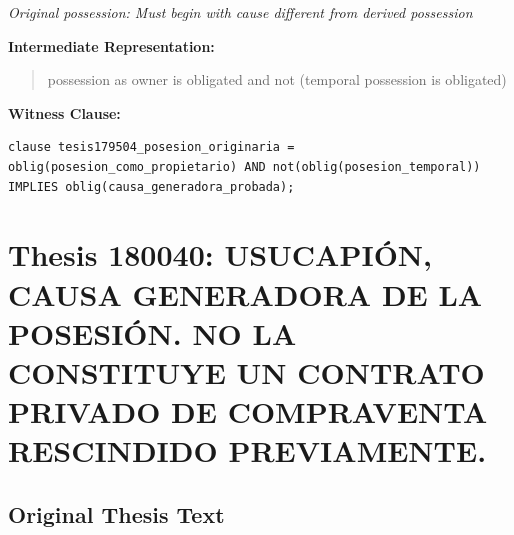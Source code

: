 \documentclass[11pt,a4paper]{article}
\begin{document}
\textit{Original possession: Must begin with cause different from derived possession}

\textbf{Intermediate Representation:}

\begin{quote}
possession as owner is obligated and not (temporal possession is obligated)
\end{quote}

\textbf{Witness Clause:}

\begin{lstlisting}[style=witnessstyle, language=Witness]
clause tesis179504_posesion_originaria = oblig(posesion_como_propietario) AND not(oblig(posesion_temporal)) IMPLIES oblig(causa_generadora_probada);
\end{lstlisting}

\newpage

\section{Thesis 180040: USUCAPIÓN, CAUSA GENERADORA DE LA POSESIÓN. NO LA CONSTITUYE UN CONTRATO PRIVADO DE COMPRAVENTA RESCINDIDO PREVIAMENTE.}
\label{thesis:180040}

\subsection{Original Thesis Text}
\end{document}
